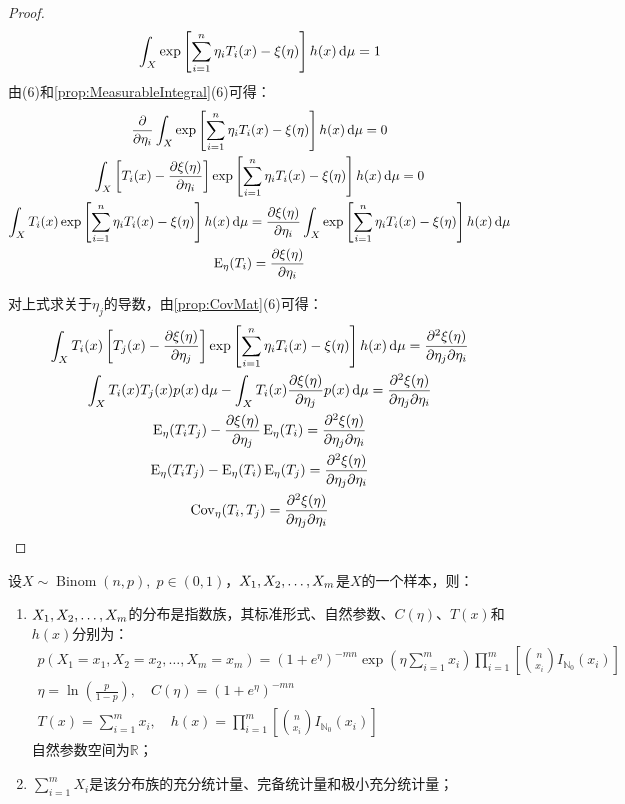 \begin{proof}
\begin{equation*}
		\int_{X}\exp\left[\sum_{i=1}^{n}\eta_iT_i(x)-\xi(\eta)\right]h(x)\mathop{}\!\mathrm{d}\mu=1
	\end{equation*}
	由(6)和\cref{prop:MeasurableIntegral}(6)可得：
	\begin{gather*}
		\frac{\partial}{\partial\eta_i}\int_{X}\exp\left[\sum_{i=1}^{n}\eta_iT_i(x)-\xi(\eta)\right]h(x)\mathop{}\!\mathrm{d}\mu=0 \\
		\int_{X}\left[T_i(x)-\frac{\partial \xi(\eta)}{\partial\eta_i}\right]\exp\left[\sum_{i=1}^{n}\eta_iT_i(x)-\xi(\eta)\right]h(x)\mathop{}\!\mathrm{d}\mu=0 \\
		\int_{X}T_i(x)\exp\left[\sum_{i=1}^{n}\eta_iT_i(x)-\xi(\eta)\right]h(x)\mathop{}\!\mathrm{d}\mu=\frac{\partial \xi(\eta)}{\partial\eta_i}\int_{X}\exp\left[\sum_{i=1}^{n}\eta_iT_i(x)-\xi(\eta)\right]h(x)\mathop{}\!\mathrm{d}\mu \\
		\operatorname{E}_{\eta}(T_i)=\frac{\partial \xi(\eta)}{\partial\eta_i}
	\end{gather*}\par
	对上式求关于$\eta_j$的导数，由\cref{prop:CovMat}(6)可得：
	\begin{gather*}
		\int_{X}T_i(x)\left[T_j(x)-\frac{\partial \xi(\eta)}{\partial\eta_j}\right]\exp\left[\sum_{i=1}^{n}\eta_iT_i(x)-\xi(\eta)\right]h(x)\mathop{}\!\mathrm{d}\mu=\frac{\partial^2 \xi(\eta)}{\partial\eta_j\partial\eta_i} \\
		\int_{X}T_i(x)T_j(x)p(x)\mathop{}\!\mathrm{d}\mu-\int_{X}T_i(x)\frac{\partial \xi(\eta)}{\partial\eta_j}p(x)\mathop{}\!\mathrm{d}\mu=\frac{\partial^2 \xi(\eta)}{\partial\eta_j\partial\eta_i} \\
		\operatorname{E}_{\eta}(T_iT_j)-\frac{\partial \xi(\eta)}{\partial\eta_j}\operatorname{E}_{\eta}(T_i)=\frac{\partial^2 \xi(\eta)}{\partial\eta_j\partial\eta_i} \\
		\operatorname{E}_{\eta}(T_iT_j)-\operatorname{E}_{\eta}(T_i)\operatorname{E}_{\eta}(T_j)=\frac{\partial^2 \xi(\eta)}{\partial\eta_j\partial\eta_i} \\
		\operatorname{Cov}_{\eta}(T_i,T_j)=\frac{\partial^2 \xi(\eta)}{\partial\eta_j\partial\eta_i}\qedhere
	\end{gather*}
\end{proof}
\begin{theorem}
	设$X\sim\operatorname{Binom}(n,p),\;p\in(0,1)$，$X_1, X_2, \dots, X_{m}$是$X$的一个样本，则：
	\begin{enumerate}
		\item $X_1, X_2, \dots, X_{m}$的分布是指数族，其标准形式、自然参数、$C(\eta)$、$T(x)$和$h(x)$分别为：
		\begin{gather*}
			p(X_1=x_1,X_2=x_2,\dots,X_m=x_m)=(1+e^{\eta})^{-mn}\exp\left(\eta\sum_{i=1}^{m}x_i\right)\prod_{i=1}^{m}\left[\binom{n}{x_i}I_{\mathbb{N}_0}(x_i)\right] \\
			\eta=\ln\left(\frac{p}{1-p}\right),\quad C(\eta)=(1+e^{\eta})^{-mn} \\ T(x)=\sum_{i=1}^{m}x_i,\quad h(x)=\prod_{i=1}^{m}\left[\binom{n}{x_i}I_{\mathbb{N}_0}(x_i)\right]
		\end{gather*}
		自然参数空间为$\mathbb{R}$；
		\item $\sum\limits_{i=1}^{m}X_i$是该分布族的充分统计量、完备统计量和极小充分统计量；
	\end{enumerate}
\end{theorem}
